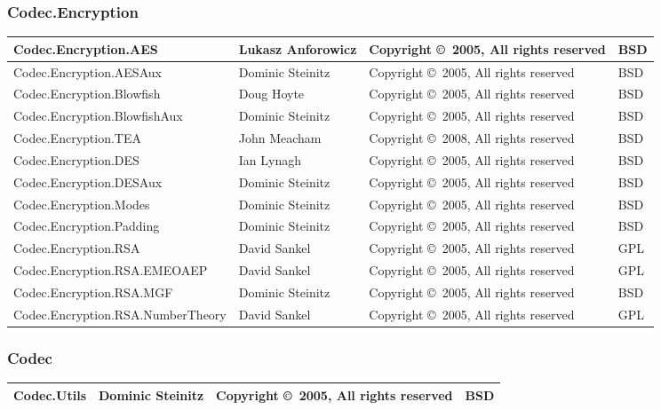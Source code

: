 \documentclass{article}
\begin{document}
\subsubsection{Codec.Encryption}
\begin{tabular}{|p{6cm}|p{3cm}|p{3cm}|p{1cm}|}
\hline\hline
Codec.Encryption.AES & Lukasz Anforowicz &
Copyright \copyright\ 2005, All rights reserved & BSD \\
\hline
Codec.Encryption.AESAux & Dominic Steinitz &
Copyright \copyright\ 2005, All rights reserved & BSD \\
\hline
Codec.Encryption.Blowfish & Doug Hoyte &
Copyright \copyright\ 2005, All rights reserved & BSD \\
\hline
Codec.Encryption.BlowfishAux & Dominic Steinitz &
Copyright \copyright\ 2005, All rights reserved & BSD \\
\hline
Codec.Encryption.TEA & John Meacham &
Copyright \copyright\ 2008, All rights reserved & BSD \\
\hline
Codec.Encryption.DES & Ian Lynagh &
Copyright \copyright\ 2005, All rights reserved & BSD \\
\hline
Codec.Encryption.DESAux & Dominic Steinitz &
Copyright \copyright\ 2005, All rights reserved & BSD \\
\hline
Codec.Encryption.Modes & Dominic Steinitz &
Copyright \copyright\ 2005, All rights reserved & BSD \\
\hline
Codec.Encryption.Padding & Dominic Steinitz &
Copyright \copyright\ 2005, All rights reserved & BSD \\
\hline
Codec.Encryption.RSA & David Sankel &
Copyright \copyright\ 2005, All rights reserved & GPL \\
\hline
Codec.Encryption.RSA.EMEOAEP & David Sankel &
Copyright \copyright\ 2005, All rights reserved & GPL \\
\hline
Codec.Encryption.RSA.MGF & Dominic Steinitz &
Copyright \copyright\ 2005, All rights reserved & BSD \\
\hline
Codec.Encryption.RSA.NumberTheory & David Sankel &
Copyright \copyright\ 2005, All rights reserved & GPL \\
\hline\hline
\end{tabular}

\subsubsection{Codec}
\begin{tabular}{|p{6cm}|p{3cm}|p{3cm}|p{1cm}|}
\hline\hline
Codec.Utils & Dominic Steinitz &
Copyright \copyright\ 2005, All rights reserved & BSD \\
\hline\hline
\end{tabular}
\end{document}
